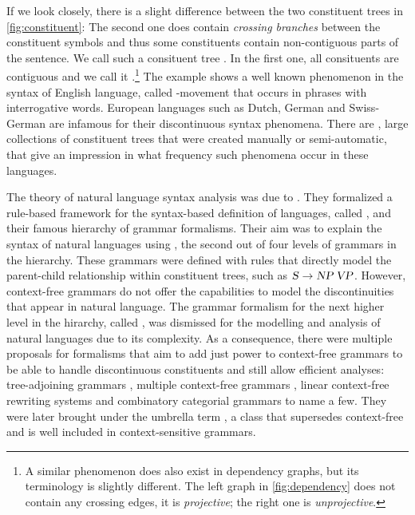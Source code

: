 \documentclass[../document.tex]{subfiles}
\begin{document}
    If we look closely, there is a slight difference between the two constituent trees in \cref{fig:constituent}:
        The second one does contain \emph{crossing branches} between the constituent symbols and thus some constituents contain non-contiguous parts of the sentence.
    We call such a consituent tree .
    In the first one, all consituents are contiguous and we call it .\footnote{
        A similar phenomenon does also exist in dependency graphs, but its terminology is slightly different.
        The left graph in \cref{fig:dependency} does not contain any crossing edges, it is \emph{projective}; the right one is \emph{unprojective}.
    }
    The example shows a well known phenomenon in the syntax of English language, called -movement that occurs in phrases with interrogative words.
    European languages such as Dutch, German and Swiss-German are infamous for their discontinuous syntax phenomena. \citep{Shieber85,Becker91}
    There are , large collections of constituent trees that were created manually or semi-automatic, that give an impression in what frequency such phenomena occur in these languages. \citep{Marcus94,EvaKal11,Skut98,Brants04,Noo13}
    
    The theory of natural language syntax analysis was due to \citet{Cho56}.
    They formalized a rule-based framework for the syntax-based definition of languages, called , and their famous hierarchy of grammar formalisms.
    Their aim was to explain the syntax of natural languages using , the second out of four levels of grammars in the hierarchy.
    These grammars were defined with rules that directly model the parent-child relationship within constituent trees, such as \(\textsc{\textsl{S}} \to \textsc{\textsl{NP}}\,\textsc{\textsl{VP}}\).
    However, context-free grammars do not offer the capabilities to model the discontinuities that appear in natural language. \citep{Shieber85}
    The grammar formalism for the next higher level in the hirarchy, called , was dismissed for the modelling and analysis of natural languages due to its complexity.
    As a consequence, there were multiple proposals for formalisms that aim to add just power to context-free grammars to be able to handle discontinuous constituents and still allow efficient analyses:
        tree-adjoining grammars \citep{JosLevTak75}, multiple context-free grammars \citep{SekMatFujKas91}, linear context-free rewriting systems \citep{VijWeiJos87} and combinatory categorial grammars \citep{Ste11} to name a few.
    They were later brought under the umbrella term , a class that supersedes context-free and is well included in context-sensitive grammars.
    
\end{document}
